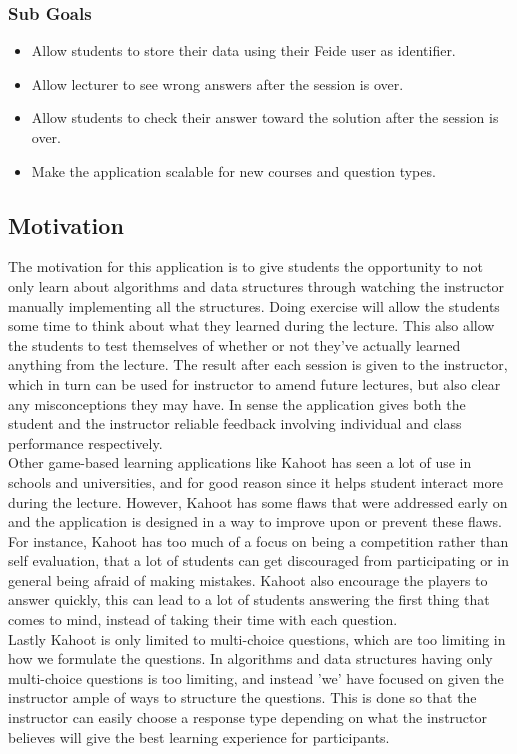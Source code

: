 \subsubsection{Sub Goals}
\begin{itemize}
\item Allow students to store their data using their Feide user as identifier.
\item Allow lecturer to see wrong answers after the session is over.
\item Allow students to check their answer toward the solution after the session is over.
\item Make the application scalable for new courses and question types.
\end{itemize}

\subsection{Motivation}
The motivation for this application is to give students the opportunity to not only learn about algorithms and data structures through watching the instructor manually implementing all the structures. Doing exercise will allow the students some time to think about what they learned during the lecture. This also allow the students to test themselves of whether or not they've actually learned anything from the lecture. The result after each session is given to the instructor, which in turn can be used for instructor to amend future lectures, but also clear any misconceptions they may have. In sense the application gives both the student and the instructor reliable feedback involving individual and class performance respectively.
\\[11pt]
Other game-based learning applications like Kahoot has seen a lot of use in schools and universities, and for good reason since it helps student interact more during the lecture. However, Kahoot has some flaws that were addressed early on and the application is designed in a way to improve upon or prevent these flaws. For instance, Kahoot has too much of a focus on being a competition rather than self evaluation, that a lot of students can get discouraged from participating or in general being afraid of making mistakes. Kahoot also encourage the players to answer quickly, this can lead to a lot of students answering the first thing that comes to mind, instead of taking their time with each question.
\\[11pt]
Lastly Kahoot is only limited to multi-choice questions, which are too limiting in how we formulate the questions. In algorithms and data structures having only multi-choice questions is too limiting, and instead 'we' have focused on given the instructor ample of ways to structure the questions. This is done so that the instructor can easily choose a response type depending on what the instructor believes will give the best learning experience for participants.

